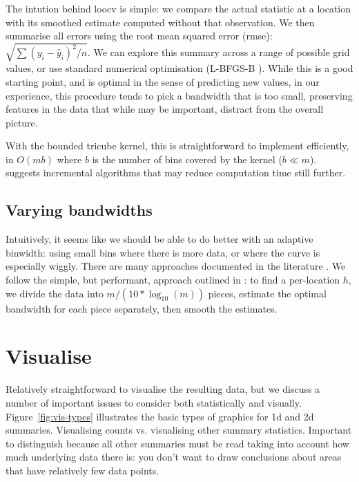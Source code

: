 \documentclass[journal]{vgtc}                %
\begin{document}
The intution behind loocv is simple: we compare the actual statistic at a location with its smoothed estimate computed without that observation. We then summarise all errors using the root mean squared error (rmse): $\sqrt{ \sum (y_i - \hat{y}_i)^2 / n}$. We can explore this summary across a range of possible grid values, or use standard numerical optimisation (L-BFGS-B \citep{byrd:1995}). While this is a good starting point, and is optimal in the sense of predicting new values, in our experience, this procedure tends to pick a bandwidth that is too small, preserving features in the data that while may be important, distract from the overall picture.

With the bounded tricube kernel, this is straightforward to implement efficiently, in $O(m b)$ where $b$ is the number of bins covered by the kernel ($b \ll m$). \citep{fan:1994} suggests incremental algorithms that may reduce computation time still further.

\subsection{Varying bandwidths}

Intuitively, it seems like we should be able to do better with an adaptive binwidth: using small bins where there is more data, or where the curve is especially wiggly. There are many approaches documented in the literature  \citep{terrell:1992, brockmann:1993,schucany:1995,herrmann:1997}. We follow the simple, but performant, approach outlined in \citep{fan:1995}: to find a per-location $h$, we divide the data into $m / (10 * \log_{10}(m))$ pieces, estimate the optimal bandwidth for each piece separately, then smooth the estimates.


\section{Visualise}
\label{sec:visualise}

Relatively straightforward to visualise the resulting data, but we discuss a number of important issues to consider both statistically and visually.  Figure~\ref{fig:vis-types} illustrates the basic types of graphics for 1d and 2d summaries. Visualising counts vs. visualising other summary statistics.  Important to distinguish because all other summaries must be read taking into account how much underlying data there is: you don't want to draw conclusions about areas that have relatively few data points.
\end{document}
